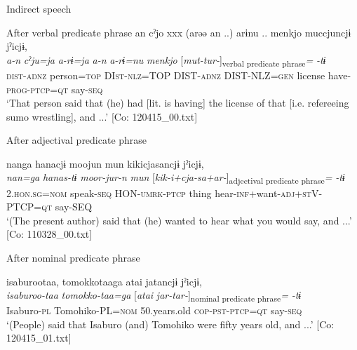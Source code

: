 \ea\label{ex:10.63}   Indirect speech\\
  \begin{xlist}
  \exi{} After verbal predicate phrase
    \ex  %
      \glll    an  cˀjo  xxx  (arəə  an ..)   arɨnu ..  {\textbar}menkjo{\textbar}  muccjuncjɨ  jˀicjɨ,\\
      \textit{a-n}  \textit{cˀju=ja}  {}  \textit{a-rɨ=ja}  \textit{a-n} {}  \textit{a-rɨ=nu} {} \textit{menkjo}  [\textit{mut-tur-}]\textsubscript{verbal predicate phrase}\textit{=}  \textit{-tɨ}\\
      \textsc{dist}-\textsc{adnz}  person=\textsc{top}  {}  DI\textsc{st}-\textsc{nlz}=TOP  DIST-\textsc{adnz}  {} DIST-NLZ=\textsc{gen} {} license  have-\textsc{prog}-\textsc{ptcp}=\textsc{qt}  say-\textsc{seq}\\
      \glt       ‘That person said that (he) had [lit. is having] the license of that [i.e. refereeing sumo wrestling], and ...’ [Co: 120415\_00.txt]

  \exi{} After adjectival predicate phrase

  \ex{}%
      \glll    nanga  hanacjɨ  moojun  mun  kikicjasancjɨ  jˀicjɨ,\\
      \textit{nan=ga}  \textit{hanas-tɨ}  \textit{moor-jur-n}  \textit{mun}   [\textit{kik-i+cja-sa+ar-}]\textsubscript{adjectival predicate phrase}\textit{=}  \textit{-tɨ}\\
      2.\textsc{hon}.\textsc{sg}=\textsc{nom}  speak-\textsc{seq}  HON-\textsc{umrk}-\textsc{ptcp}  thing  hear-\textsc{inf}+want-\textsc{adj}+\textsc{st}V-PTCP=\textsc{qt}  say-SEQ\\
      \glt       ‘(The present author) said that (he) wanted to hear what you would say, and ...’ [Co: 110328\_00.txt]

  \exi{} After nominal predicate phrase

  \ex  %
      \glll    isaburootaa,  tomokkotaaga  atai  jatancjɨ  jˀicjɨ,\\
      \textit{isaburoo-taa}  \textit{tomokko-taa=ga}  [\textit{atai}  \textit{jar-tar-}]\textsubscript{nominal predicate phrase}\textit{=} \textit{-tɨ}\\
      Isaburo-\textsc{pl}  Tomohiko-PL=\textsc{nom}  50.years.old  \textsc{cop}-\textsc{pst}-\textsc{ptcp}=\textsc{qt}   say-\textsc{seq}\\
      \glt       ‘(People) said that Isaburo (and) Tomohiko were fifty years old, and ...’ [Co: 120415\_01.txt]
    \end{xlist}
\z

